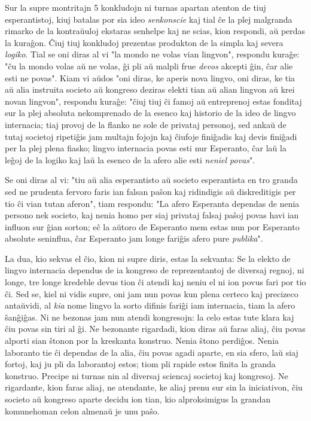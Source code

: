    Sur la supre montritajn 5 konkludojn ni turnas apartan atenton de
tiuj esperantistoj, kiuj batalas por sia ideo {\sl senkonscie} kaj
tial \^ce la plej malgranda rimarko de la kontra\u uuloj ekstaras
senhelpe kaj ne scias, kion respondi, a\u u perdas la kura\^gon.
\^Ciuj tiuj konkludoj prezentas produkton de la simpla kaj severa
{\sl logiko}. Tial se oni diras al vi "la mondo ne volas vian
lingvon", respondu kura\^ge: "\^cu la mondo volas a\u u ne volas,
\^gi pli a\u u malpli frue {\sl devos} akcepti \^gin, \^car alie
esti ne povas". Kiam vi a\u udos "oni diras, ke aperis nova
lingvo, oni diras, ke tia a\u u alia instruita societo a\u u
kongreso deziras elekti tian a\u u alian lingvon a\u u krei novan
lingvon", respondu kura\^ge: "\^ciuj tiuj \^ci famoj a\u u
entreprenoj estas fonditaj sur la plej absoluta nekomprenado de la
esenco kaj historio de la ideo de lingvo internacia; tiaj provoj de
la flanko ne sole de privataj personoj, sed anka\u u de tutaj
societoj ripeti\^gis jam multajn fojojn kaj \^ciufoje fini\^gadis
kaj devis fini\^gadi per la plej plena fiasko; lingvo internacia
povas esti nur Esperanto, \^car la\u u la le\^goj de la logiko kaj
la\u u la esenco de la afero alie esti {\sl neniel povas}".

   Se oni diras al vi: "tiu a\u u alia esperantisto a\u u societo
esperantista en tro granda sed ne prudenta fervoro faris ian falsan
pa\^son kaj ridindigis a\u u diskreditigis per tio \^ci vian tutan
aferon", tiam respondu: "La afero Esperanta dependas de nenia
persono nek societo, kaj nenia homo per siaj privataj falsaj pa\^soj
povas havi ian influon sur \^gian sorton; e\^c la a\u utoro de
Esperanto mem estas nun por Esperanto absolute seninflua, \^car
Esperanto jam longe fari\^gis afero pure {\sl publika}".

   La dua, kio sekvas el \^cio, kion ni supre diris, estas la
sekvanta: Se la elekto de lingvo internacia dependus de ia kongreso
de reprezentantoj de diversaj regnoj, ni longe, tre longe kredeble
devus tion \^ci atendi kaj neniu el ni ion povus fari por tio \^ci.
Sed se, kiel ni vidis supre, oni jam nun povas kun plena certeco kaj
precizeco anta\u uvidi, al {\sl kia} nome lingvo la sorto difinis
fari\^gi iam internacia, tiam la afero \^san\^gi\^gas. Ni ne bezonas
jam nun atendi kongresojn: la celo estas tute klara kaj \^ciu povas
sin tiri al \^gi. Ne bezonante rigardadi, kion diras a\u u faras
aliaj, \^ciu povas alporti sian \^stonon por la kreskanta konstruo.
Nenia \^stono perdi\^gos. Nenia laboranto tie \^ci dependas de la
alia, \^ciu povas agadi aparte, en sia sfero, la\u u siaj fortoj,
kaj ju pli da laborantoj estos; tiom pli rapide estos finita la
granda konstruo. Precipe ni turnas nin al diversaj sciencaj societoj
kaj kongresoj. Ne rigardante, kion faras aliaj, ne atendante, ke
aliaj prenu sur sin la iniciativon, \^ciu societo a\u u kongreso
aparte decidu ion tian, kio alproksimigus la grandan komunehoman
celon almena\u u je unu pa\^so.

\smallrule{}

